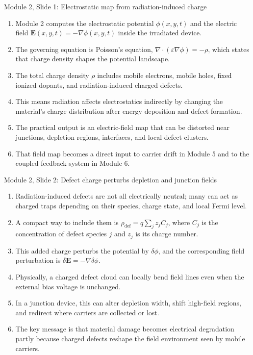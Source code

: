 \documentclass[11pt]{article}
\newcommand{\Evec}{\bm{E}}
\begin{document}
\begin{slidebox}{Module 2, Slide 1: Electrostatic map from radiation-induced charge}
\begin{enumerate}
\item Module 2 computes the electrostatic potential \(\phi(x,y,t)\) and the electric field \(\Evec(x,y,t)=-\nabla\phi(x,y,t)\) inside the irradiated device.
\item The governing equation is Poisson's equation, \(\nabla\cdot(\varepsilon\nabla\phi)=-\rho\), which states that charge density shapes the potential landscape.
\item The total charge density \(\rho\) includes mobile electrons, mobile holes, fixed ionized dopants, and radiation-induced charged defects.
\item This means radiation affects electrostatics indirectly by changing the material's charge distribution after energy deposition and defect formation.
\item The practical output is an electric-field map that can be distorted near junctions, depletion regions, interfaces, and local defect clusters.
\item That field map becomes a direct input to carrier drift in Module 5 and to the coupled feedback system in Module 6.
\end{enumerate}
\end{slidebox}

\begin{slidebox}{Module 2, Slide 2: Defect charge perturbs depletion and junction fields}
\begin{enumerate}
\item Radiation-induced defects are not all electrically neutral; many can act as charged traps depending on their species, charge state, and local Fermi level.
\item A compact way to include them is \(\rho_{\mathrm{def}}=q\sum_j z_jC_j\), where \(C_j\) is the concentration of defect species \(j\) and \(z_j\) is its charge number.
\item This added charge perturbs the potential by \(\delta\phi\), and the corresponding field perturbation is \(\delta\Evec=-\nabla\delta\phi\).
\item Physically, a charged defect cloud can locally bend field lines even when the external bias voltage is unchanged.
\item In a junction device, this can alter depletion width, shift high-field regions, and redirect where carriers are collected or lost.
\item The key message is that material damage becomes electrical degradation partly because charged defects reshape the field environment seen by mobile carriers.
\end{enumerate}
\end{slidebox}
\end{document}
